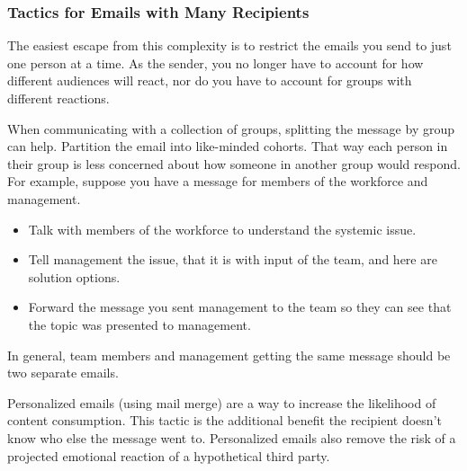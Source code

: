 \subsubsection*{Tactics for Emails with Many Recipients}
The easiest escape from this complexity is to restrict the emails you send to just one person at a time. As the sender, you no longer have to account for how different audiences will react, nor do you have to account for groups with different reactions.

When communicating with a collection of groups, splitting the message by group can help. Partition the email into like-minded cohorts. That way each person in their group is less concerned about how someone in another group would respond. For example, suppose you have a message for members of the workforce and management.
\begin{itemize}
\item Talk with members of the workforce to understand the systemic issue.
\item Tell management the issue, that it is with input of the team, and here are solution options.
\item Forward the message you sent management to the team so they can see that the topic was presented to management.
\end{itemize}
In general, team members and management getting the same message should be two separate emails.

Personalized emails (using mail merge) are a way to increase the likelihood of content consumption. This tactic is the additional benefit the recipient doesn't know who else the message went to. Personalized emails also remove the risk of a projected emotional reaction of a hypothetical third party.
